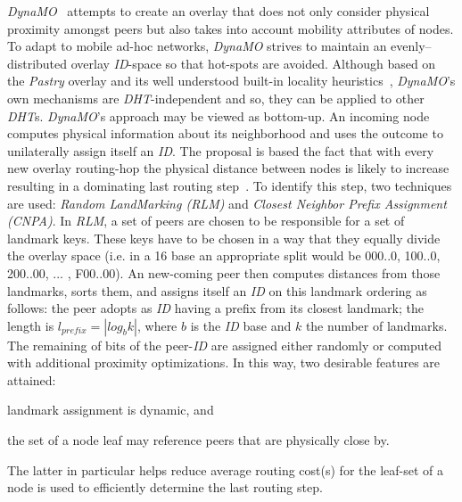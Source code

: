 \emph{DynaMO}~\cite{WZS2004} attempts to create an overlay that 
does not only consider physical proximity amongst peers but also
takes into account mobility attributes of nodes.
To adapt to mobile ad-hoc networks, \emph{DynaMO} strives
to maintain an evenly--distributed overlay \emph{ID}-space 
so that hot-spots are avoided. 
Although based on the \emph{Pastry} overlay and 
its well understood built-in locality heuristics~\cite{CDCR2002a},
\emph{DynaMO}'s own mechanisms are \emph{DHT}-independent and 
so, they can be applied to other \emph{DHT}s.
\emph{DynaMO}'s approach may be viewed as bottom-up. 
An incoming node computes physical information about its neighborhood
and uses the outcome to unilaterally assign itself an \emph{ID}.
The proposal is based the fact that with every new overlay routing-hop
the physical distance between nodes is likely to increase
resulting in a dominating
last routing step~\cite{antony_pastry_2001,CDCR2002a}.
To identify this step, two techniques are used: 
\emph{Random LandMarking (RLM)} and 
\emph{Closest Neighbor Prefix Assignment (CNPA)}.
In \emph{RLM}, a set of peers are chosen to be responsible 
for a set of landmark keys. These keys have to be chosen in a way that they
equally divide the overlay space (i.e. in a 16 base an appropriate split
would be 000..0, 100..0, 200..00, ... , F00..00).
An new-coming peer then computes distances from those landmarks,
sorts them, and assigns itself an \emph{ID} on this 
landmark ordering as follows:
the peer adopts as \emph{ID} having a prefix from its closest
landmark; the length is 
$l_{prefix}=|log_b k|$, where $b$ is the \emph{ID} base 
and $k$ the number of landmarks. 
The remaining of bits of the peer-\emph{ID} are assigned either 
randomly or computed with additional proximity optimizations.
In this way, two desirable features are attained:
\begin{inparaenum}
  \item landmark assignment is dynamic, and
  \item the set of a node leaf may reference peers that are 
	physically close by.
\end{inparaenum}
The latter in particular helps reduce average routing cost(s)
for the leaf-set of a node is used to efficiently determine the 
last routing step.

